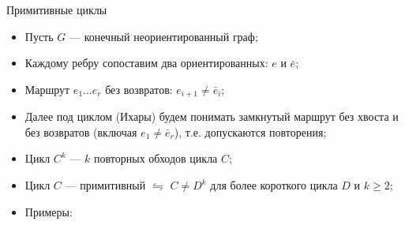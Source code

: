 \documentclass[serif, aspectratio=169]{beamer}
\begin{document}
\begin{frame}{Примитивные циклы}
    \begin{itemize}
        \item Пусть $G$ --- конечный неориентированный граф;
        \item Каждому ребру сопоставим два ориентированных: $e$ и $\bar e$;
        \item Маршрут $e_1 \dots e_r$ без возвратов: $e_{i+1}\ne\bar e_i$;
        \item Далее под циклом (Ихары) будем понимать замкнутый маршрут без хвоста и без возвратов (включая $e_1\ne\bar e_r$), т.е. допускаются повторения;
        \item Цикл $C^k$ --- $k$ повторных обходов цикла $C$;
        \item Цикл $C$ --- примитивный $\leftrightharpoons$ $C\neq D^k$ для более короткого цикла $D$ и $k\ge2$;
        \item Примеры:
        \vspace{-2ex}
        \begin{center}
            \begin{actionenv}
            \begin{minipage}[t]{0.31\linewidth}
                \centering
\end{minipage}
\end{actionenv}
\end{center}
\end{itemize}
\end{frame}
\end{document}
